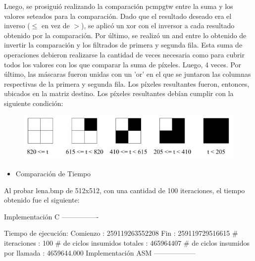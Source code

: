\documentclass[10pt, a4paper]{article}
\begin{document}
\begin{itemize}
Luego, se prosiguió realizando la comparación pcmpgtw entre la suma y los valores seteados para la comparación. Dado que el resultado deseado era el inverso ($\leq$ en vez de $>$), se aplicó un xor con el inversor a cada resultado obtenido por la comparación. Por último, se realizó un and entre lo obtenido de invertir la comparación y los filtrados de primera y segunda fila. Esta suma de operaciones debieron realizarse la cantidad de veces necesaria como para cubrir todos los valores con los que comparar la suma de píxeles. Luego, 4 veces. Por último, las máscaras fueron unidas con un 'or' en el que se juntaron las columnas respectivas de la primera y segunda fila. Los píxeles resultantes fueron, entonces, ubicados en la matriz destino.\newline
Los píxeles resultantes debían cumplir con la siguiente condición:
\begin{figure}[H] %
\begin{center}
\includegraphics[width=400pt]{./halftone.jpg}
\end{center}
\end{figure}

\begin{itemize}
\item{Comparación de Tiempo}
\end{itemize}
Al probar lena.bmp de 512x512, con una cantidad de 100 iteraciones, el tiempo obtenido fue el siguiente:\newline

Implementación C\newline
----------------

Tiempo de ejecución:\newline
  Comienzo                          : 259119263552208\newline
  Fin                               : 259119729516615\newline
  \# iteraciones                     : 100\newline
  \# de ciclos insumidos totales     : 465964407\newline
  \# de ciclos insumidos por llamada : 4659644.000\newline
\newline
Implementación ASM\newline
------------------


\end{itemize}
\end{document}
